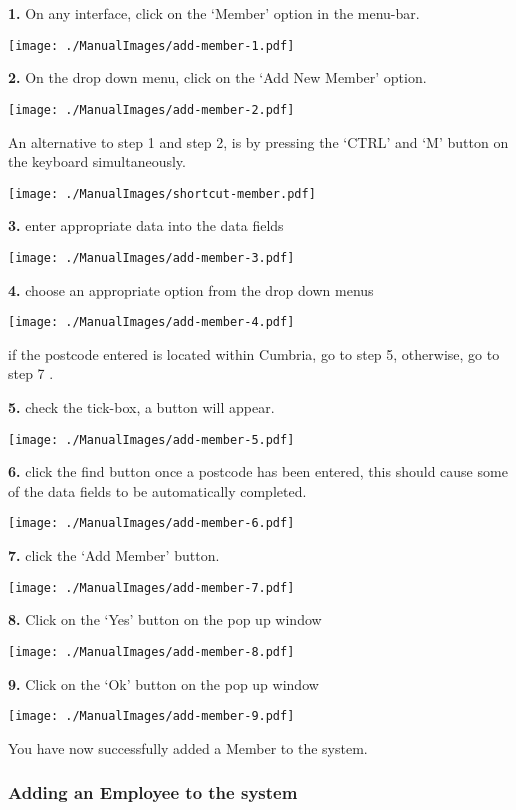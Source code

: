 \textbf{1.} On any interface, click on the `Member' option in the menu-bar.

\texttt{[image: ./ManualImages/add-member-1.pdf]}

\textbf{2.} On the drop down menu, click on the `Add New Member' option.

\texttt{[image: ./ManualImages/add-member-2.pdf]}

An alternative to step 1 and step 2, is by pressing the `CTRL' and `M' button on the keyboard simultaneously.

\texttt{[image: ./ManualImages/shortcut-member.pdf]}

\textbf{3.} enter appropriate data into the data fields

\texttt{[image: ./ManualImages/add-member-3.pdf]}

\textbf{4.} choose an appropriate option from the drop down menus

\texttt{[image: ./ManualImages/add-member-4.pdf]}

if the postcode entered is located within Cumbria, go to step 5, otherwise, go to step 7 .

\textbf{5.} check the tick-box, a button will appear.

\texttt{[image: ./ManualImages/add-member-5.pdf]}

\textbf{6.} click the find button once a postcode has been entered, this should cause some of the data fields to be automatically completed.

\texttt{[image: ./ManualImages/add-member-6.pdf]}

\textbf{7.} click the `Add Member' button.

\texttt{[image: ./ManualImages/add-member-7.pdf]}

\textbf{8.} Click on the `Yes' button on the pop up window

\texttt{[image: ./ManualImages/add-member-8.pdf]}

\textbf{9.} Click on the `Ok' button on the pop up window

\texttt{[image: ./ManualImages/add-member-9.pdf]}

You have now successfully added a Member to the system.

\pagebreak
\subsubsection{Adding an Employee to the system}
\label{fig:Adding an Employee to the system}

